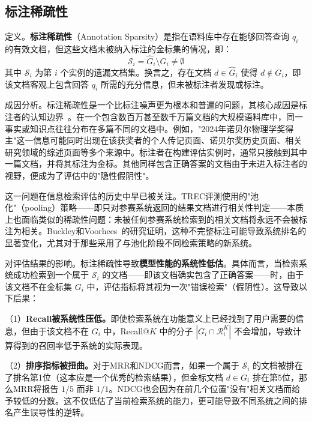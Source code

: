 \subsection{标注稀疏性}

定义。\textbf{标注稀疏性}（Annotation Sparsity）是指在语料库中存在能够回答查询 $q_i$ 的有效文档，但这些文档未被纳入标注的金标集的情况，即：
\begin{equation}
    \mathcal{S}_i = \hat{G}_i \setminus G_i \neq \emptyset
\end{equation}
其中 $\mathcal{S}_i$ 为第 $i$ 个实例的遗漏文档集。换言之，存在文档 $d \in \hat{G}_i$ 使得 $d \notin G_i$，即该文档客观上包含回答 $q_i$ 所需的充分信息，但未被标注者发现或标注。

成因分析。标注稀疏性是一个比标注噪声更为根本和普遍的问题，其核心成因是标注者的认知边界~\citep{zobel1998reliable, buckley2004retrieval}。在一个包含数百万甚至数千万篇文档的大规模语料库中，同一事实或知识点往往分布在多篇不同的文档中。例如，"2024年诺贝尔物理学奖得主"这一信息可能同时出现在该获奖者的个人传记页面、诺贝尔奖历史页面、相关研究领域的综述页面等多个来源中。标注者在构建评估实例时，通常只接触到其中一篇文档，并将其标注为金标。其他同样包含正确答案的文档由于未进入标注者的视野，便成为了评估中的"隐性假阴性"。

这一问题在信息检索评估的历史中早已被关注。TREC评测使用的"池化"（pooling）策略——即只对参赛系统返回的结果文档进行相关性判定——本质上也面临类似的稀疏性问题：未被任何参赛系统检索到的相关文档将永远不会被标注为相关。Buckley和Voorhees~\citep{buckley2004retrieval}的研究证明，这种不完整标注可能导致系统排名的显著变化，尤其对于那些采用了与池化阶段不同检索策略的新系统。

对评估结果的影响。标注稀疏性导致\textbf{模型性能的系统性低估}。具体而言，当检索系统成功检索到一个属于 $\mathcal{S}_i$ 的文档——即该文档确实包含了正确答案——时，由于该文档不在金标集 $G_i$ 中，评估指标将其视为一次"错误检索"（假阴性）。这导致以下后果：

（1）\textbf{Recall被系统性压低。}即使检索系统在功能意义上已经找到了用户需要的信息，但由于该文档不在 $G_i$ 中，Recall@$K$ 中的分子 $|G_i \cap \mathcal{R}_i^K|$ 不会增加，导致计算得到的召回率低于系统的实际表现。
    
（2）\textbf{排序指标被扭曲。}对于MRR和NDCG而言，如果一个属于 $\mathcal{S}_i$ 的文档被排在了排名第1位（这本应是一个优秀的检索结果），但金标文档 $d \in G_i$ 排在第5位，那么MRR将报告 $1/5$ 而非 $1/1$。NDCG也会因为在前几个位置"没有"相关文档而给予较低的分数。这不仅低估了当前检索系统的能力，更可能导致不同系统之间的排名产生误导性的逆转。
    
